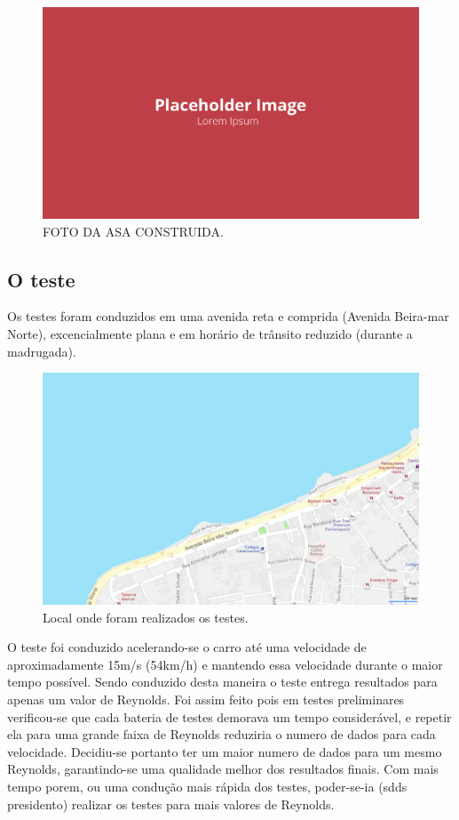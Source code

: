 \begin{figure}[!ht]
    \centering
    \includegraphics[width=.8\linewidth]{figuras/outras/placeholder.png}
    \caption{FOTO DA ASA CONSTRUIDA\cite{autor}.}
    \label{fig:placeholder}
\end{figure}

\subsection{O teste}

Os testes foram conduzidos em uma avenida reta e comprida (Avenida Beira-mar Norte), excencialmente plana e em horário de trânsito reduzido (durante a madrugada).

\begin{figure}[!ht]
    \centering
    \includegraphics[width=.8\linewidth]{figuras/internet/here_open_street_maps.png}
    \caption{Local onde foram realizados os testes\cite{autor}.}
    \label{fig:mapa_teste}
\end{figure}

O teste foi conduzido acelerando-se o carro até uma velocidade de aproximadamente 15m/s (54km/h) e mantendo essa velocidade durante o maior tempo possível. Sendo conduzido desta maneira o teste entrega resultados para apenas um valor de Reynolds. Foi assim feito pois em testes preliminares verificou-se que cada bateria de testes demorava um tempo considerável, e repetir ela para uma grande faixa de Reynolds reduziria o numero de dados para cada velocidade. Decidiu-se portanto ter um maior numero de dados para um mesmo Reynolds, garantindo-se uma qualidade melhor dos resultados finais. Com mais tempo porem, ou uma condução mais rápida dos testes, poder-se-ia (sdds presidento) realizar os testes para mais valores de Reynolds.  


